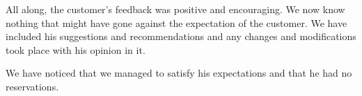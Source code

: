 All along, the customer's feedback was positive and encouraging. We now know nothing that might have gone against the expectation of the customer. We have included his suggestions and recommendations and any changes and modifications took place with his opinion in it.

We have noticed that we managed to satisfy his expectations and that he had no reservations.
	


